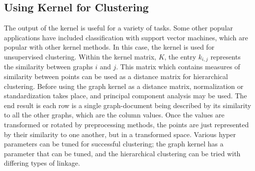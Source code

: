 
\subsection{Using Kernel for Clustering}

\hspace*{0.3cm} The output of the kernel is useful for a variety of tasks. Some other popular applications have included classification with support vector machines, which are popular with other kernel methods. In this case, the kernel is used for unsupervised clustering. Within the kernel matrix, $K$, the entry $k_{i,j}$ represents the similarity between graphs $i$ and $j$. This matrix which contains measures of similarity between points can be used as a distance matrix for hierarchical clustering. Before using the graph kernel as a distance matrix, normalization or standardization takes place, and principal component analysis may be used. The end result is each row is a single graph-document being described by its similarity to all the other graphs, which are the column values. Once the values are transformed or rotated by preprocessing methods, the points are just represented by their similarity to one another, but in a transformed space. Various hyper parameters can be tuned for successful clustering; the graph kernel has a parameter that can be tuned, and the hierarchical clustering can be tried with differing types of linkage.













